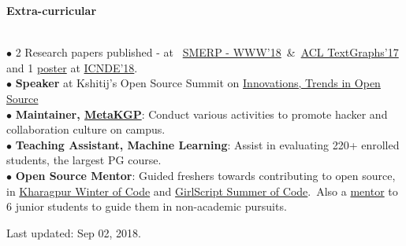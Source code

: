 \documentclass[11pt, a4paper]{resume}
\newcommand{\important}[1]{
  \textcolor{mypurple}{#1}
}
\newcommand{\fillit}[1]{
  \leavevmode\xleaders\hbox{#1}\hfill\kern0pt
}
\newcommand{\sectionTitle}[1]{
  \begin{Large}
      \important{\textbf{#1}} 
    \end{Large}
    \important{\rlap{\rule[.5ex]{\linegoal}{0.5pt}}{}}
     \vspace{0.1em}\\
}
\begin{document}
\sectionTitle{Extra-curricular}
$\bullet$ 2 Research papers published - at \, \href{https://www.cse.iitk.ac.in/users/kripa/smerp2018/}{SMERP - WWW'18} \,\&\, \href{https://sites.google.com/site/textgraphs2017/program}{ACL TextGraphs'17} and 1 \href{https://drive.google.com/file/d/1fCH2AAAHWp5JLwQxLNGoOYoGnyWrolHf/view?usp=sharing}{poster} at \href{http://cse.iitkgp.ac.in/conf/NSDE/sds/ICNDE2018/pages/selected.html}{ICNDE'18}. \\
$\bullet$ {\bf Speaker} at Kshitij's Open Source Summit on \href{https://www.youtube.com/watch?v=lk4ciY3NSbA}{Innovations, Trends in Open Source}\\
$\bullet$ {\bf Maintainer, \href{http://metakgp.github.io}{MetaKGP}}: Conduct various activities to promote hacker and collaboration culture on campus.\\
$\bullet$ {\bf Teaching Assistant, Machine Learning}: Assist in evaluating 220+ enrolled students, the largest PG course.\\
$\bullet$ {\bf Open Source Mentor}: Guided freshers towards contributing to open source, in \href{https://kwoc.kossiitkgp.in/}{Kharagpur Winter of Code} and \href{https://gssoc.tech/projects.html#facebook-archive}{GirlScript Summer of Code}.\, Also a \href{https://drive.google.com/file/d/0B5iU6cWw36rOc0gzcjZPRTd5SkU/view?usp=sharing}{mentor} to 6 junior students to guide them in non-academic pursuits.
  \vspace*{\fill}
    \vspace{-0.63em}
  \begin{flushright}
  \scriptsize Last updated: Sep 02, 2018.
  \end{flushright}
    
\end{document}
